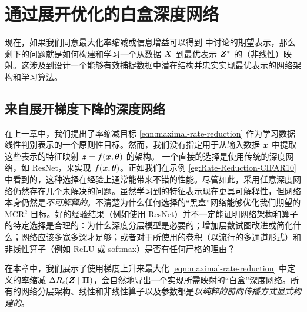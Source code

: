 \documentclass[../../book-main_zh.tex]{subfiles}
\begin{document}
\section{通过展开优化的白盒深度网络}\label{sec:chap4-white-box-model-via-unrolling}


现在，如果我们同意最大化率缩减或信息增益可以得到  中讨论的期望表示，那么剩下的问题就是如何构建和学习一个从数据 $\bm{X}$ 到最优表示 $\bm{Z}^*$ 的（非线性）映射。这涉及到设计一个能够有效捕捉数据中潜在结构并忠实实现最优表示的网络架构和学习算法。


\subsection{来自展开梯度下降的深度网络}

在上一章中，我们提出了率缩减目标 \eqref{eqn:maximal-rate-reduction} 作为学习数据线性判别表示的一个原则性目标。然而，我们没有指定用于从输入数据 $\bm{x}$ 中提取这些表示的特征映射 $\bm{z} = f(\bm{x}, \bm \theta)$ 的架构。
一个直接的选择是使用传统的深度网络，如 ResNet，来实现 $f(\bm{x}, \bm \theta)$。正如我们在示例 \ref{eg:Rate-Reduction-CIFAR10} 中看到的，这种选择在经验上通常能带来不错的性能。尽管如此，采用任意深度网络仍然存在几个未解决的问题。虽然学习到的特征表示现在更具可解释性，但网络本身仍然是{\em 不可解释的}。不清楚为什么任何选择的“黑盒”网络能够优化我们期望的 MCR$^2$ 目标。好的经验结果（例如使用 ResNet）并不一定能证明网络架构和算子的特定选择是合理的：为什么深度分层模型是必要的；增加层数试图改进或简化什么；网络应该多宽多深才足够；或者对于所使用的卷积（以流行的多通道形式）和非线性算子（例如 ReLU 或 softmax）是否有任何严格的理由？

在本章中，我们展示了使用梯度上升来最大化 \eqref{eqn:maximal-rate-reduction} 中定义的率缩减 $\Delta R_{\epsilon}(\bm{Z} \mid \bm \Pi)$，会自然地导出一个实现所需映射的“白盒”深度网络。所有的网络分层架构、线性和非线性算子以及参数都是{\em 以纯粹的前向传播方式显式构建的}。
\end{document}
